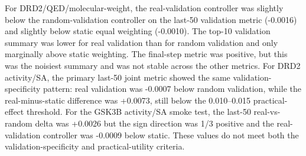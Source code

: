 \documentclass[referee,lineno,pdflatex,sn-basic]{sn-jnl}
\theoremstyle{thmstyleone}%
\theoremstyle{thmstyletwo}%
\theoremstyle{thmstylethree}%
\begin{document}
For DRD2/QED/molecular-weight, the real-validation controller was slightly below the random-validation controller on the last-50 validation metric (-0.0016) and slightly below static equal weighting (-0.0010). The top-10 validation summary was lower for real validation than for random validation and only marginally above static weighting. The final-step metric was positive, but this was the noisiest summary and was not stable across the other metrics. For DRD2 activity/SA, the primary last-50 joint metric showed the same validation-specificity pattern: real validation was -0.0007 below random validation, while the real-minus-static difference was +0.0073, still below the 0.010--0.015 practical-effect threshold. For the GSK3B activity/SA smoke test, the last-50 real-vs-random delta was +0.0026 but the sign direction was 1/3 positive and the real-validation controller was -0.0009 below static. These values do not meet both the validation-specificity and practical-utility criteria.
\end{document}
